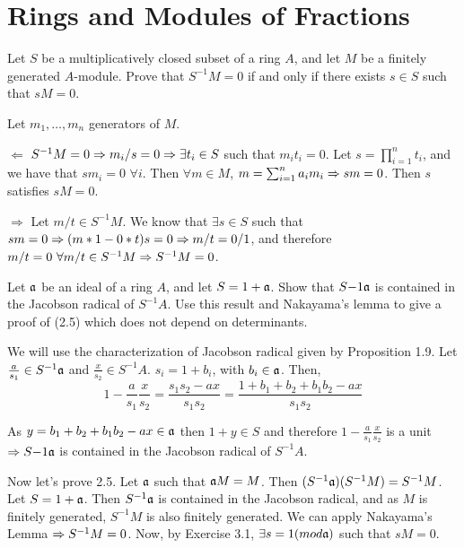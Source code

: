 \section{Rings and Modules of Fractions}

\begin{ex}
	Let $S$ be a multiplicatively closed subset of a ring $A$, and let $M$ be a finitely generated $A$-module. Prove that $S^{-1} M = 0$ if and only if there exists $s \in S$ such that $sM = 0$.
\end{ex}

\begin{sol}
	Let $m_1, \dots, m_n$ generators of $M$.

	$\boxed{\Leftarrow}$ $S^{-1}M = 0 \Rightarrow m_i/s = 0 \Rightarrow \exists t_i \in S$ such that $m_i t_i = 0$. Let $s = \prod_{i = 1}^n t_i$, and we have that $s m_i = 0 \, \, \forall i$. Then $\forall m \in M$, $m = \sum_{i = 1}^n a_i m_i \Rightarrow sm = 0$. Then $s$ satisfies $sM = 0$. 

	$\boxed{\Rightarrow}$ Let $m/t \in S^{-1}M$. We know that $\exists s \in S$ such that $sm = 0 \Rightarrow (m*1 - 0*t)s = 0 \Rightarrow m/t = 0/1$, and therefore $m/t = 0 \, \, \forall m/t \in S^{-1}M \Rightarrow S^{-1}M = 0$.
\end{sol}

\begin{ex}
	Let $\mathfrak{a}$ be an ideal of a ring $A$, and let $S = 1 + \mathfrak{a}$. Show that $S{-1} \mathfrak{a}$ is contained in the Jacobson radical of $S^{-1} A$.
	Use this result and Nakayama's lemma to give a proof of (2.5) which does not depend on determinants.
\end{ex}

\begin{sol}
	We will use the characterization of Jacobson radical given by Proposition 1.9. Let $\frac{a}{s_1} \in S^{-1}\mathfrak{a}$ and $\frac{x}{s_2} \in S^{-1}A$. $s_i = 1 + b_i$, with $b_i \in \mathfrak{a}$. Then,
	\[
		1 - \frac{a}{s_1}\frac{x}{s_2} = \frac{s_1s_2 -ax}{s_1s_2} = \frac{1 + b_1 + b_2 + b_1b_2 -ax}{s_1s_2}
	\]

	As $y = b_1 + b_2 + b_1b_2 -ax \in \mathfrak{a}$ then $1 + y \in S$ and therefore $1 - \frac{a}{s_1}\frac{x}{s_2}$ is a unit $\Rightarrow S{-1} \mathfrak{a}$ is contained in the Jacobson radical of $S^{-1} A$.

	Now let's prove 2.5. Let $\mathfrak{a}$ such that $\mathfrak{a} M = M$. Then  $(S^{-1} \mathfrak{a})(S^{-1}M) = S^{-1}M$. Let $S = 1 + \mathfrak{a}$. Then $S^{-1}\mathfrak{a}$ is contained in the Jacobson radical, and as $M$ is finitely generated, $S^{-1}M$ is also finitely generated. We can apply Nakayama's Lemma $\Rightarrow S^{-1}M = 0$. Now, by Exercise 3.1, $\exists s = 1(mod \mathfrak{a})$ such that $sM = 0$.
\end{sol}

